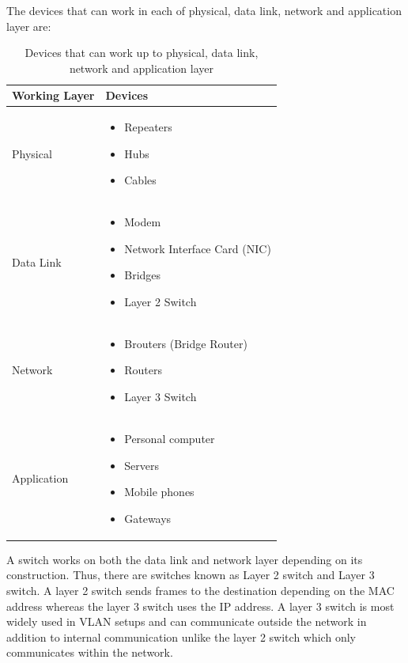 \documentclass{lab_sheet}
\begin{document}
The devices that can work in each of physical, data link, network and application layer are:
\begin{table}[H]
    \centering
    \begin{tabular}{|C{4cm}|C{7.5cm}|}
        \hline
        \textbf{Working Layer} & \textbf{Devices}           \\ \hline
        Physical               & \begin{itemize}
            \item Repeaters
            \item Hubs
            \item Cables
        \end{itemize} \\ \hline
        Data Link              & \begin{itemize}
            \item Modem
            \item Network Interface Card (NIC)
            \item Bridges
            \item Layer 2 Switch
        \end{itemize} \\ \hline
        Network                & \begin{itemize}
            \item Brouters (Bridge Router)
            \item Routers
            \item Layer 3 Switch
        \end{itemize} \\ \hline
        Application            & \begin{itemize}
            \item Personal computer
            \item Servers
            \item Mobile phones
            \item Gateways
        \end{itemize} \\ \hline
    \end{tabular}
    \caption{Devices that can work up to physical, data link, network and application layer}
\end{table}
A switch works on both the data link and network layer depending on its construction. Thus, there are switches known as Layer 2 switch and Layer 3 switch. A layer 2 switch sends frames to the destination depending on the MAC address whereas the layer 3 switch uses the IP address. A layer 3 switch is most widely used in VLAN setups and can communicate outside the network in addition to internal communication unlike the layer 2 switch which only communicates within the network.
\end{document}
